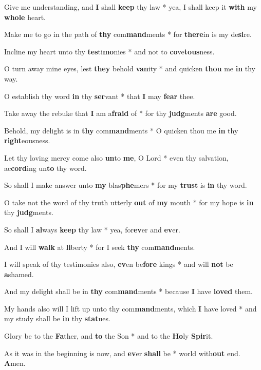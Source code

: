 \begin{multicols}{2}
	Give me understanding, and \textbf{I} shall \textbf{keep} thy law * yea, I shall keep it \textbf{with} my \textbf{whole} heart.
	
	Make me to go in the path of \textbf{thy} com\textbf{mand}ments * for \textbf{there}in is my de\textbf{si}re.
	
	Incline my heart unto thy \textbf{tes}ti\textbf{mo}nies * and not to \textbf{co}ve\textbf{tous}ness.
	
	O turn away mine eyes, lest \textbf{they} behold \textbf{van}ity * and quicken \textbf{thou} me \textbf{in} thy way.
	
	O establish thy word \textbf{in} thy \textbf{ser}vant * that \textbf{I} may \textbf{fear} thee.
	
	Take away the rebuke that \textbf{I} am a\textbf{fraid} of * for thy \textbf{judg}ments \textbf{are} good.
	
	Behold, my delight is in \textbf{thy} com\textbf{mand}ments * O quicken thou me \textbf{in} thy \textbf{right}eousness.
	
	Let thy loving mercy come also \textbf{un}to \textbf{me}, O Lord * even thy salvation, ac\textbf{cord}ing un\textbf{to} thy word.
	
	So shall I make answer unto \textbf{my} blas\textbf{phe}mers * for my \textbf{trust} is \textbf{in} thy word.
	
	O take not the word of thy truth utterly \textbf{out} of \textbf{my} mouth * for my hope is \textbf{in} thy \textbf{judg}ments.
	
	So shall I \textbf{al}ways \textbf{keep} thy law * yea, for\textbf{ev}er and \textbf{ev}er.
	
	And I will \textbf{walk} at \textbf{li}berty * for I seek \textbf{thy} com\textbf{mand}ments.
	
	I will speak of thy testimonies also, \textbf{ev}en be\textbf{fore} kings * and will \textbf{not} be \textbf{a}shamed.
	
	And my delight shall be in \textbf{thy} com\textbf{mand}ments * because \textbf{I} have \textbf{loved} them.
	
	My hands also will I lift up unto thy com\textbf{mand}ments, which \textbf{I} have loved * and my study shall be \textbf{in} thy \textbf{stat}ues.
	
	Glory be to the \textbf{Fa}ther, and \textbf{to} the Son * and to the \textbf{Ho}ly \textbf{Spir}it.
	
	As it was in the beginning is now, and \textbf{ev}er \textbf{shall} be * world with\textbf{out} end. \textbf{A}men.
\end{multicols}